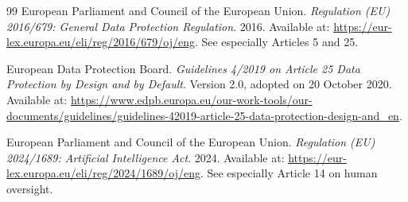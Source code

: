 \documentclass[11pt,a4paper]{article}
\begin{document}
\begin{thebibliography}{99}
European Parliament and Council of the European Union.
\emph{Regulation (EU) 2016/679: General Data Protection Regulation}.
2016.
Available at: \url{https://eur-lex.europa.eu/eli/reg/2016/679/oj/eng}.
See especially Articles 5 and 25.

European Data Protection Board.
\emph{Guidelines 4/2019 on Article 25 Data Protection by Design and by Default}.
Version 2.0, adopted on 20 October 2020.
Available at: \url{https://www.edpb.europa.eu/our-work-tools/our-documents/guidelines/guidelines-42019-article-25-data-protection-design-and_en}.

European Parliament and Council of the European Union.
\emph{Regulation (EU) 2024/1689: Artificial Intelligence Act}.
2024.
Available at: \url{https://eur-lex.europa.eu/eli/reg/2024/1689/oj/eng}.
See especially Article 14 on human oversight.

\end{thebibliography}
\end{document}
